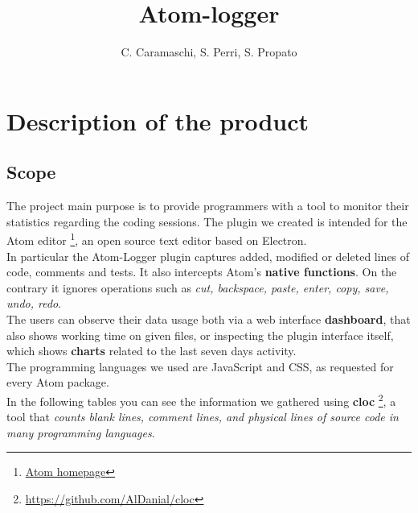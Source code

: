 \documentclass[a4paper,10pt]{report}
\title{Atom-logger}
\author{C. Caramaschi, S. Perri, S. Propato}
\begin{document}
\maketitle
\tableofcontents

\newpage
\chapter{Description of the product} %
\section{Scope}

The project main purpose is to provide programmers with a tool to monitor their statistics regarding the coding sessions.
The plugin we created is intended for the Atom editor \footnote{\href{https://atom.io/}{Atom homepage}}, an open source text editor based on Electron. \\
	In particular the Atom-Logger plugin captures added, modified or deleted lines of code, comments and tests. It also intercepts Atom's \textbf{native functions}. On the contrary it ignores operations such as \emph{cut, backspace, paste, enter, copy, save, undo, redo}.\\
	The users can observe their data usage both via a web interface \textbf{dashboard}, that also shows working time on given files, or inspecting the plugin interface itself, which shows \textbf{charts} related to the last seven days activity.\\
The programming languages we used are JavaScript and CSS, as requested for every Atom package.\\
In the following tables you can see the information we gathered using \textbf{cloc} \footnote{\href{https://github.com/AlDanial/cloc}{https://github.com/AlDanial/cloc}}, a tool that \textit{counts blank lines, comment lines, and physical lines of source code in many programming languages}. 
\end{document}
